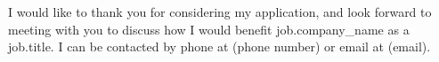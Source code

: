 I would like to thank you for considering my application, and look forward to meeting with you to discuss how I would benefit {{job.company_name}} as a {{job.title}}. I can be contacted by phone at (phone number) or email at (email).
